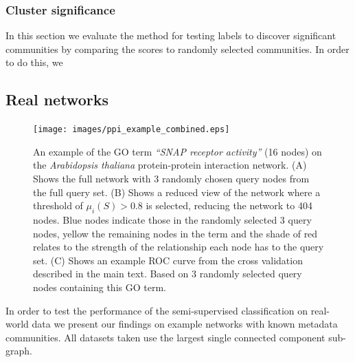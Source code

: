 \documentclass[sigconf]{acmart}
\begin{document}
\subsubsection{Cluster significance}
In this section we evaluate the method for testing labels to discover significant communities by comparing the scores to randomly selected communities.
In order to do this, we 

\subsection{Real networks}

\begin{figure}[ht]
\texttt{[image: images/ppi\_example\_combined.eps]}
\caption{An example of the GO term \textit{``SNAP receptor activity''} (16 nodes) on the \textit{Arabidopsis thaliana} protein-protein interaction network.
(A) Shows the full network with 3 randomly chosen query nodes from the full query set.
(B) Shows a reduced view of the network where a threshold of $\mu_i(S) > 0.8$ is selected, reducing the network to 404 nodes.
Blue nodes indicate those in the randomly selected 3 query nodes, yellow the remaining nodes in the term and the shade of red relates to the strength of the relationship each node has to the query set.
(C) Shows an example ROC curve from the cross validation described in the main text. 
Based on 3 randomly selected query nodes containing this GO term.
}
\label{fig:query_example}
\end{figure}

In order to test the performance of the semi-supervised classification on real-world data we present our findings on example networks with known metadata communities.
All datasets taken use the largest single connected component sub-graph.
\end{document}

